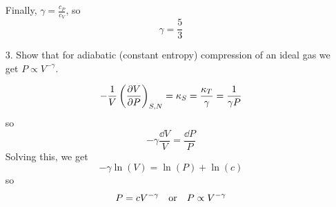 \documentclass[a4paper,twoside]{article}
\begin{document}
\begin{itemize}
\begin{problem}
            Finally, $ \gamma = \frac{c_P}{c_V} $, so
            \begin{equation}
                \gamma = \frac{5}{3}
            \end{equation}
        \end{problem}
    \item[3.] Show that for adiabatic (constant entropy) compression of an ideal gas we get $ P \propto V^{- \gamma} $.
        \begin{problem}
            \begin{equation}
                - \frac{1}{V} \left( \pdv{V}{P} \right)_{S,N} = \kappa_S = \frac{\kappa_T}{\gamma} = \frac{1}{\gamma P}
            \end{equation}
            so
            \begin{equation}
                - \gamma \frac{\dd{V}}{V} = \frac{\dd{P}}{P}
            \end{equation}
            Solving this, we get
            \begin{equation}
                - \gamma \ln(V) = \ln(P) + \ln(c)
            \end{equation}
            so
            \begin{equation}
                P = c V^{- \gamma} \qor P \propto V^{- \gamma}
            \end{equation}
        \end{problem}
\end{itemize}
\end{document}
